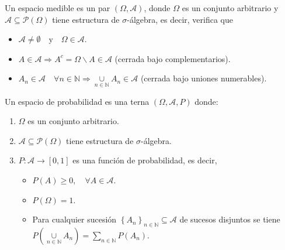 \begin{definicion}
	Un espacio medible es un par $(\Omega, \mathcal{A})$, donde $\Omega$ es un conjunto arbitrario y $\mathcal{A} \subseteq \mathcal{P}(\Omega)$ tiene estructura de $\sigma$-álgebra, es decir, verifica que 
		
		\begin{itemize}
			\item $\mathcal{A} \neq \emptyset \quad \text{y} \quad \Omega \in \mathcal{A}$.

			\item $A \in \mathcal{A} \Rightarrow A^c = \Omega \backslash A \in \mathcal{A}$ (cerrada bajo complementarios).

			\item $A_n \in \mathcal{A} \quad \forall n \in \mathbb{N} \Rightarrow \underset{n \in \mathbb{N}}{\cup} A_n \in \mathcal{A}$ (cerrada bajo uniones numerables).
		\end{itemize}
\end{definicion}


\begin{definicion}\label{def:esprob}
	Un espacio de probabilidad es una terna $(\Omega, \mathcal{A},P)$ donde:
	
	\begin{enumerate}
	
		\item $\Omega$ es un conjunto arbitrario.

		\item{$\mathcal{A} \subseteq \mathcal{P}(\Omega)$ tiene estructura de $\sigma$-álgebra.

		}

		\item{$P:\mathcal{A} \rightarrow [0,1]$ es una función de probabilidad, es decir,

		\begin{itemize}
			\item $P(A)\geq 0, \quad \forall A \in \mathcal{A}$.

			\item $P(\Omega)=1$.

			\item Para cualquier sucesión $\left \{ A_n \right \}_{n \in \mathbb{N}} \subseteq \mathcal{A}$ de sucesos disjuntos se tiene $P \left ( \underset{n \in \mathbb{N}}{\cup} A_n \right ) = \sum_{n \in \mathbb{N}} P(A_n)$.
		\end{itemize}

		}
	\end{enumerate}
\end{definicion}


